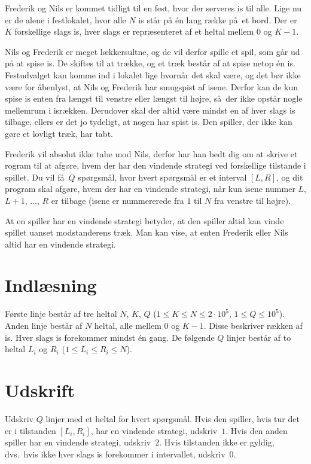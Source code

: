 Frederik og Nils er kommet tidligt til en fest, hvor der serveres is til alle.
Lige nu er de alene i festlokalet, hvor alle $N$ is står på én lang række på et bord.
Der er $K$ forskellige slags is, hver slags er repræsenteret af et heltal mellem $0$ og $K-1$.

Nils og Frederik er meget lækkersultne, og de vil derfor spille et spil, som går ud på at spise is.
De skiftes til at trække, og et træk består af at spise netop én is.
Festudvalget kan komme ind i lokalet lige hvornår det skal være, og det bør ikke være for åbenlyst, at Nils og Frederik har smugspist af isene.
Derfor kan de kun spise is enten fra længst til venstre eller længst til højre, så der ikke opstår nogle mellemrum i isrækken.
Derudover skal der altid være mindst en af hver slags is tilbage, ellers er det jo tydeligt, at nogen har spist is.
Den spiller, der ikke kan gøre et lovligt træk, har tabt.

Frederik vil absolut ikke tabe mod Nils, derfor har han bedt dig om at skrive et rogram til at afgøre, hvem der har den vindende strategi ved forskellige tilstande i spillet.
Du vil få $Q$ spørgsmål, hvor hvert spørgsmål er et interval $[L,R]$, og dit program skal afgøre, hvem der har en vindende strategi, når kun isene nummer $L$, $L+1$, $\dots$, $R$ er tilbage (isene er nummererede fra $1$ til $N$ fra venstre til højre).

At en spiller har en vindende strategi betyder, at den spiller altid kan vinde spillet uanset modstanderens træk.
Man kan vise, at enten Frederik eller Nils altid har en vindende strategi.

\section*{Indlæsning}
Første linje består af tre heltal $N$, $K$, $Q$ ($1 \le K \le N \le 2 \cdot 10^5$, $1 \le Q \le 10^5$).
Anden linje består af $N$ heltal, alle mellem $0$ og $K-1$.
Disse beskriver rækken af is.
Hver slags is forekommer mindst én gang.
De følgende $Q$ linjer består af to heltal $L_i$ og $R_i$ ($1 \le L_i \le R_i \le N$).

\section*{Udskrift}
Udskriv $Q$ linjer med et heltal for hvert spørgsmål.
Hvis den spiller, hvis tur det er i tilstanden $[L_i, R_i]$, har en vindende strategi, udskriv~$1$.
Hvis den anden spiller har en vindende strategi, udskriv~$2$.
Hvis tilstanden ikke er gyldig, dvs.\ hvis ikke hver slags is forekommer i intervallet, udskriv~$0$.

